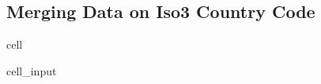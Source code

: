 \documentclass[letterpaper,10pt,english]{jupyterBook}
\begin{document}
\subsection{Merging Data on Iso3 Country Code}
\label{\detokenize{notebooks/replicating_paper:id9}}
\begin{sphinxuseclass}{cell}\begin{sphinxVerbatimInput}

\begin{sphinxuseclass}{cell_input}
\begin{sphinxVerbatim}[commandchars=\\\{\}]
     
\end{sphinxVerbatim}

\end{sphinxuseclass}\end{sphinxVerbatimInput}

\end{sphinxuseclass}
\end{document}
